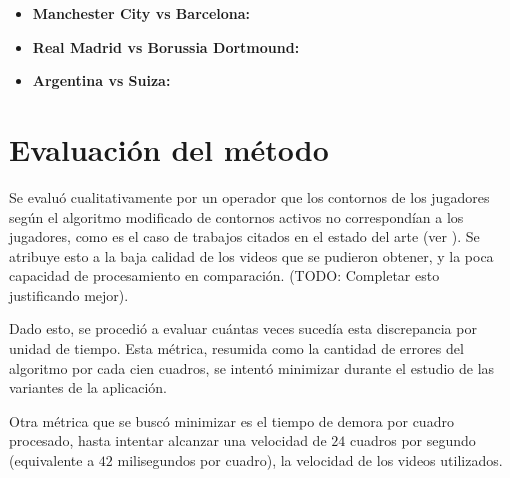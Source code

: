 \begin{itemize}
  \item \textbf{Manchester City vs Barcelona:}
  \item \textbf{Real Madrid vs Borussia Dortmound:}
  \item \textbf{Argentina vs Suiza:}
\end{itemize}

\section{Evaluación del método}

Se evaluó cualitativamente por un operador que los contornos de los jugadores según el algoritmo modificado de contornos activos no correspondían a los jugadores, como es el caso de trabajos citados en el estado del arte (ver \cite{papers-tanos}). Se atribuye esto a la baja calidad de los videos que se pudieron obtener, y la poca capacidad de procesamiento en comparación. (TODO: Completar esto justificando mejor).

Dado esto, se procedió a evaluar cuántas veces sucedía esta discrepancia por unidad de tiempo. Esta métrica, resumida como la cantidad de errores del algoritmo por cada cien cuadros, se intentó minimizar durante el estudio de las variantes de la aplicación.

Otra métrica que se buscó minimizar es el tiempo de demora por cuadro procesado, hasta intentar alcanzar una velocidad de $24$ cuadros por segundo (equivalente a $42$ milisegundos por cuadro), la velocidad de los videos utilizados.



